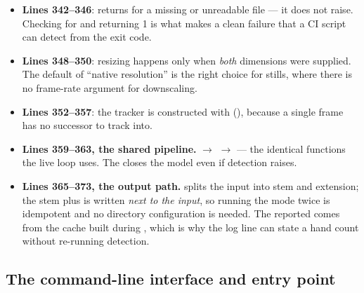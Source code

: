 \begin{itemize}
  \item \textbf{Lines 342--346}:  returns  for a missing or unreadable
        file --- it does not raise. Checking for  and returning 1 is what makes
         a clean failure that a CI script can detect from the exit
        code.
  \item \textbf{Lines 348--350}: resizing happens only when \emph{both} dimensions were supplied.
        The default of ``native resolution'' is the right choice for stills, where there is no
        frame-rate argument for downscaling.
  \item \textbf{Lines 352--357}: the tracker is constructed with 
        (), because a single frame has no successor to track into.
  \item \textbf{Lines 359--363, the shared pipeline.}  $\to$
         $\to$  --- the identical functions the live loop uses.
        The  closes the model even if detection raises.
  \item \textbf{Lines 365--373, the output path.}  splits the input into stem
        and extension; the stem plus  is written \emph{next to the input}, so running
        the mode twice is idempotent and no directory configuration is needed. The reported
         comes from the cache built during , which is why the
        log line can state a hand count without re-running detection.
\end{itemize}

\subsection{The command-line interface and entry point}

\begin{codecard}

\end{codecard}

